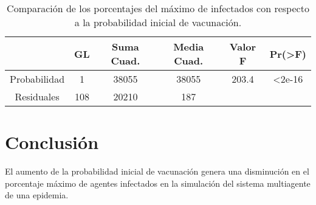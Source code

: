 \documentclass{article}
\begin{document}
\begin{table}[h]
\begin{center}
\caption{Comparación de los porcentajes del máximo de infectados con respecto a la probabilidad inicial de vacunación.}
\label{anova}
\begin{tabular}{c c c c c c}
\hline
 &\textbf{GL}&\textbf{Suma Cuad.}&\textbf{Media Cuad.}&\textbf{Valor F}&\textbf{Pr(>F)}\\
\hline
Probabilidad&1&38055&38055&203.4&<2e-16\\
Residuales&108&20210&187\\
\hline
\end{tabular}
\end{center}
\end{table}

\section{Conclusión}
El aumento de la probabilidad inicial de vacunación genera una disminución en el porcentaje máximo de agentes infectados en la simulación del sistema multiagente de una epidemia.



\end{document}
